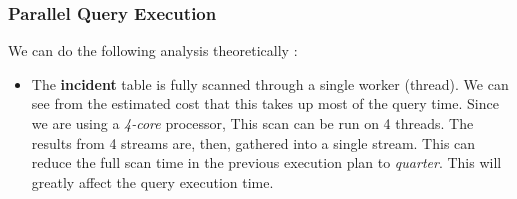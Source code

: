 \subsubsection{Parallel Query Execution}
We can do the following analysis theoretically :
\begin{itemize}
    \item The \textbf{incident} table is fully scanned through a single worker (thread). We can see from the estimated cost that this takes up most of the query time. Since we are using a \emph{4-core} processor, This scan can be run on 4 threads. The results from 4 streams are, then, gathered into a single stream. This can reduce the full scan time in the previous execution plan to \emph{quarter}. This will greatly affect the query execution time.
\end{itemize}